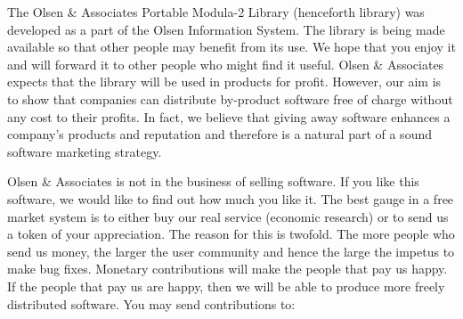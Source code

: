 %
%
%
%
%


\vspace{10ex}

The Olsen \& Associates Portable Modula-2 Library (henceforth library) was
developed as a part of the Olsen Information System.  The library is
being made available so that other people may benefit from its use.  
We hope that you enjoy it and will forward it to other people who
might find it useful.  Olsen \& Associates expects that the library will
be used in products for profit.  However, our aim is to show that companies
can distribute by-product software free of charge without any
cost to their profits.  In fact, we believe that giving away software
enhances a company's products and reputation and therefore is a natural part
of a sound software marketing strategy.

Olsen \& Associates is not in the business of selling software.  If you
like this software, we would like to find out how much you like it.
The best gauge in a free market system is to either buy our real
service (economic research) or to send us a token of your appreciation.
The reason for this is twofold.  The more people who send us money,
the larger the user community and hence the large the impetus to make
bug fixes.  Monetary contributions will make the people that pay us happy.
If the people that pay us are happy, then we will be able to produce more
freely distributed software.  You may send contributions to:

